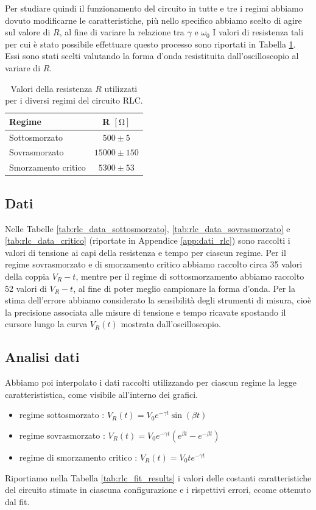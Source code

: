 \documentclass[a4paper]{article}
\begin{document}
Per studiare quindi il funzionamento del circuito in tutte e tre i regimi abbiamo dovuto modificarne le caratteristiche, più nello specifico abbiamo scelto di agire sul valore di $R$, al fine di variare la relazione tra \( \mathit{\gamma}\) e \( \mathit{\omega_0}\) I valori di resistenza tali per cui è stato possibile effettuare questo processo sono riportati in Tabella \ref{tab:rlc_resistenze}. Essi sono stati scelti valutando la forma d'onda resistituita dall'oscilloscopio al variare di $R$.
\begin{table}[htbp] %
\centering
\begin{tabular}{|l|c|}
\hline
Regime & R $[\si{\ohm}]$ \\
\hline
Sottosmorzato & $500 \pm 5$\\
Sovrasmorzato & $15000 \pm 150$ \\ %
Smorzamento critico & $5300 \pm 53$ \\ %
\hline
\end{tabular}
\caption{Valori della resistenza $R$ utilizzati per i diversi regimi del circuito RLC.}
\label{tab:rlc_resistenze}
\end{table}

\subsection{Dati}
Nelle Tabelle \ref{tab:rlc_data_sottosmorzato}, \ref{tab:rlc_data_sovrasmorzato} e \ref{tab:rlc_data_critico} (riportate in Appendice \ref{app:dati_rlc}) sono raccolti i valori di tensione ai capi della resistenza e tempo per ciascun regime. Per il regime sovrasmorzato e di smorzamento critico abbiamo raccolto circa 35 valori della coppia $V_R-t$, mentre per il regime di sottosmorzamento abbiamo raccolto 52 valori di $V_R-t$, al fine di poter meglio campionare la forma d'onda.
Per la stima dell'errore abbiamo considerato la sensibilità degli strumenti di misura, cioè la precisione associata alle misure di tensione e tempo ricavate spostando il cursore lungo la curva $V_R(t)$ mostrata dall'oscilloscopio.


\subsection{Analisi dati}
Abbiamo poi interpolato i dati raccolti utilizzando per ciascun regime la legge caratterististica, come visibile all'interno dei grafici.
\begin{itemize}
	\item regime sottosmorzato : \(V_R(t) = V_0 e^{-\gamma t }\sin (\beta t)\)
	\item regime sovrasmorzato : \(V_R(t) = V_0 e^{-\gamma t } (e^{\beta t} - e^{-\beta t}) \)
	\item regime di smorzamento critico : \(V_R(t) = V_0 t e^{-\gamma t } \)
\end{itemize}
Riportiamo nella Tabella \ref{tab:rlc_fit_results} i valori delle costanti caratteristiche del circuito stimate in ciascuna configurazione e i rispettivi errori, ccome ottenuto dal fit.
\end{document}
